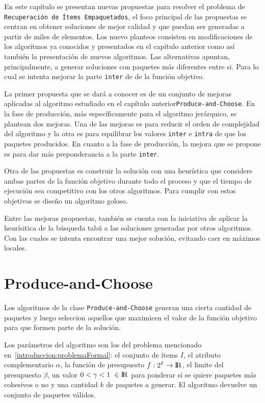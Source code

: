 En este capítulo se presentan nuevas propuestas para resolver el problema de \texttt{\\Recuperación de Ítems Empaquetados}, el foco principal de las propuestas se centran en obtener soluciones de mejor calidad y que puedan ser generadas a partir de miles de elementos. Los nuevo planteos consisten en modificaciones de los algoritmos ya conocidos y presentados en el capítulo anterior como así también la presentación de nuevos algoritmos. Las alternativas apuntan, principalmente, a generar soluciones con paquetes más diferentes entre si. Para lo cual se intenta mejorar la parte \texttt{inter} de de la función objetivo.

La primer propuesta que se dará a conocer es de un conjunto de mejoras aplicadas al algoritmo estudiado en el capítulo anterior\texttt{Produce\allowbreak-and\allowbreak-Choose}. En la fase de producción, más específicamente para el algoritmo jerárquico, se plantean dos mejoras. Una de las mejoras es para reducir el orden de complejidad del algoritmo y la otra es para equilibrar los valores \texttt{inter} e \texttt{intra} de que los paquetes producidos. En cuanto a la fase de producción, la mejora que se propone es para dar más preponderancia a la parte \texttt{inter}.

Otra de las propuestas es construir la solución con una heurística que considere ambas partes de la función objetivo durante todo el proceso y que el tiempo de ejecución sea competitivo con los otros algoritmos. Para cumplir con estos objetivos se diseño un algoritmo goloso.

Entre las mejoras propuestas, también se cuenta con la iniciativa de aplicar la heurísitica de la búsqueda tabú a las soluciones generadas por otros algoritmos. Con las cuales se intenta encontrar una mejor solución, evitando caer en máximos locales. 

\section{Produce-and-Choose}
Los algoritmos de la clase \texttt{Produce\allowbreak-and\allowbreak-Choose} generan una cierta cantidad de paquetes y luego seleccion aquellos que maximicen el valor de la función objetivo para que formen parte de la solución.

Los parámetros del algoritmo son los del problema mencionado en~\autoref{introduccion:problemaFormal}: el conjunto de ítems $I$, el atributo complementario $\alpha$, la función de presupuesto $f: 2^{I} \rightarrow \rm I \!R$, el limite del presupuesto $\beta$, un valor $0 < \gamma < 1\ \in \rm I \!R$ para ponderar si se quiere paquetes más cohesivos o no y una cantidad $k$ de paquetes a generar. El algoritmo devuelve un conjunto de paquetes válidos.


